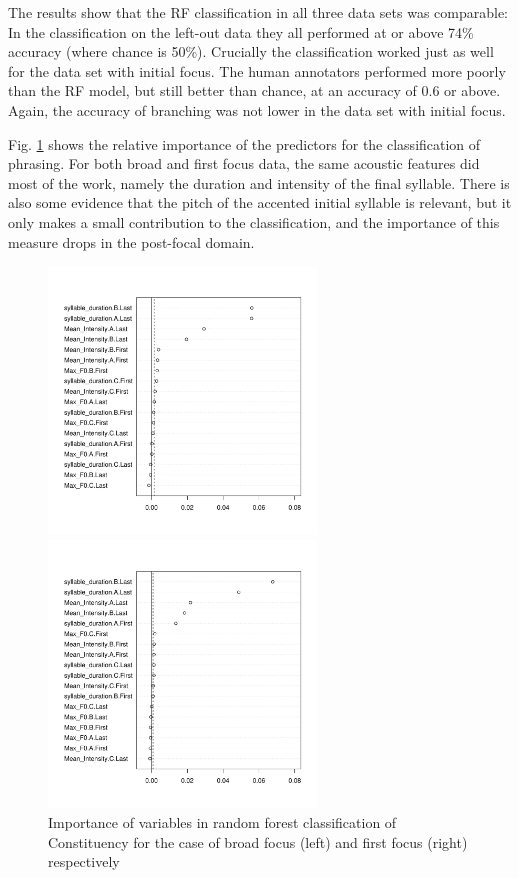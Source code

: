 \documentclass[preprint,review,12pt,authoryear,times]{elsarticle}
\begin{document}


The results show that the RF classification in all three data sets was comparable: In the classification on the left-out data they all performed at or above 74\% accuracy (where chance is 50\%). Crucially the classification worked just as well for the data set with initial focus. The human annotators performed more poorly than the RF model, but still better than chance, at an accuracy of 0.6 or above. Again, the accuracy of branching was not lower in the data set with initial focus.

Fig. \ref{phrasingForest} shows the relative importance of the predictors for the classification of phrasing. For both broad and first focus data, the same acoustic features did most of the work, namely the duration and intensity of the final syllable. There is also some evidence that the pitch of the accented initial syllable is relevant, but it only makes a small contribution to the classification, and the importance of this measure drops in the post-focal domain. 


\begin{figure}[ht!]
	\begin{center}
	{\footnotesize
	        \parbox{2.8in}{
		\includegraphics[width=2.8in]{Figures/phrasingBroadVarimp.pdf}
		}\parbox{3.5in}{
		\includegraphics[width=2.8in]{Figures/phrasingFirstVarimp.pdf}
		}
		}
		\caption{Importance of variables in random forest classification of Constituency for the case of broad focus (left) and first focus (right) respectively}
		\label{phrasingForest}
	\end{center}
\end{figure}
\end{document}
